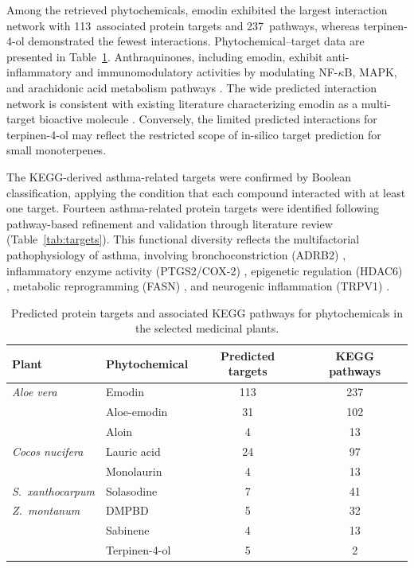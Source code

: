 \documentclass[11pt,a4paper]{article}
\begin{document}
Among the retrieved phytochemicals, emodin exhibited the largest interaction network with 113~associated protein targets and 237~pathways, whereas terpinen-4-ol demonstrated the fewest interactions. Phytochemical--target data are presented in Table~\ref{tab:phytochem}. Anthraquinones, including emodin, exhibit anti-inflammatory and immunomodulatory activities by modulating NF-$\kappa$B, MAPK, and arachidonic acid metabolism pathways \cite{habib2022,liu2026}. The wide predicted interaction network is consistent with existing literature characterizing emodin as a multi-target bioactive molecule \cite{liu2026}. Conversely, the limited predicted interactions for terpinen-4-ol may reflect the restricted scope of in-silico target prediction for small monoterpenes.

The KEGG-derived asthma-related targets were confirmed by Boolean classification, applying the condition that each compound interacted with at least one target. Fourteen asthma-related protein targets were identified following pathway-based refinement and validation through literature review (Table~\ref{tab:targets}). This functional diversity reflects the multifactorial pathophysiology of asthma, involving bronchoconstriction (ADRB2) \cite{slob2018}, inflammatory enzyme activity (PTGS2/COX-2) \cite{tanaka2024}, epigenetic regulation (HDAC6) \cite{potaczek2024}, metabolic reprogramming (FASN) \cite{ito2025}, and neurogenic inflammation (TRPV1) \cite{manti2024}.

\begin{table}[!ht]
\centering
\caption{Predicted protein targets and associated KEGG pathways for phytochemicals in the selected medicinal plants.}
\label{tab:phytochem}
\begin{tabular}{llcc}
\toprule
\textbf{Plant} & \textbf{Phytochemical} & \textbf{Predicted targets} & \textbf{KEGG pathways} \\
\midrule
\textit{Aloe vera}    & Emodin          & 113 & 237 \\
                       & Aloe-emodin     & 31  & 102 \\
                       & Aloin           & 4   & 13  \\
\textit{Cocos nucifera} & Lauric acid   & 24  & 97  \\
                       & Monolaurin      & 4   & 13  \\
\textit{S.\ xanthocarpum} & Solasodine  & 7   & 41  \\
\textit{Z.\ montanum}  & DMPBD          & 5   & 32  \\
                       & Sabinene        & 4   & 13  \\
                       & Terpinen-4-ol   & 5   & 2   \\
\bottomrule
\end{tabular}
\end{table}
\end{document}

